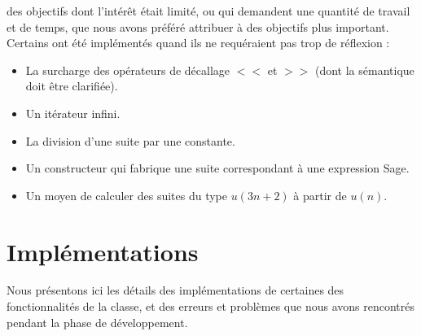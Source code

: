 \documentclass[12pt]{article}
\newcommand{\itemV}{\item[{\color{green} \ding{51}}]}
\newcommand{\itemX}{\item[{\color{red} \ding{55}}]}
\begin{document}
        des objectifs dont l'intérêt était limité, ou qui demandent une quantité de travail et de
        temps, que nous avons préféré attribuer à des objectifs plus important.
        Certains ont été implémentés quand ils ne requéraient pas trop de réflexion : 
        \begin{itemize}
            \itemX La surcharge des opérateurs de décallage $<<$ et $>>$ (dont la sémantique doit
                être clarifiée).
            \itemV Un itérateur infini.
            \itemX La division d'une suite par une constante.
            \itemX Un constructeur qui fabrique une suite correspondant à une expression Sage.
            \itemX Un moyen de calculer des suites du type $u(3n+2)$ à partir de $u(n)$.
        \end{itemize}


\section{Implémentations}
    Nous présentons ici les détails des implémentations de certaines des fonctionnalités
    de la classe, et des erreurs et problèmes que nous avons rencontrés pendant la
    phase de développement.
\end{document}
